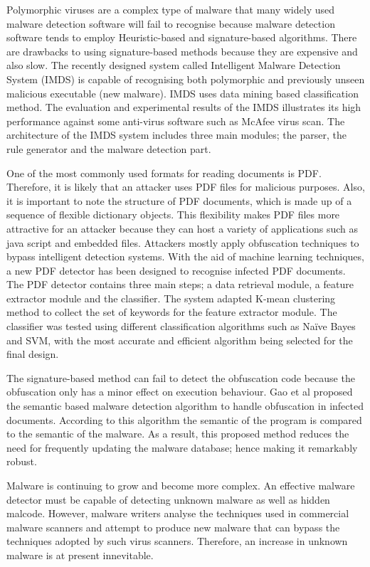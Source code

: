 Polymorphic viruses are a complex type of malware that many widely used malware detection software will fail to recognise because malware detection software tends to employ Heuristic-based and signature-based algorithms. There are drawbacks to using signature-based methods because they are expensive and also slow.  The recently designed system called Intelligent Malware Detection System (IMDS) is capable of recognising both polymorphic and previously unseen malicious executable (new malware). IMDS uses data mining based classification method. The evaluation and experimental results of the IMDS illustrates its high performance against some anti-virus software such as McAfee virus scan. The architecture of the IMDS system includes three main modules; the parser, the rule generator and the malware detection part\cite{IMDS}.

One of the most commonly used formats for reading documents is PDF. Therefore, it is likely that an attacker uses PDF files for malicious purposes. Also, it is important to note the structure of PDF documents, which is made up of a sequence of flexible dictionary objects. This flexibility makes PDF files more attractive for an attacker because they can host a variety of applications such as java script and embedded files. Attackers mostly apply obfuscation techniques to bypass intelligent detection systems. With the aid of machine learning techniques, a new PDF detector has been designed to recognise infected PDF documents\cite{maiorca2012pattern}.
The PDF detector contains three main steps; a data retrieval module, a feature extractor module and the classifier. The system adapted K-mean clustering method to collect the set of keywords for the feature extractor module. The classifier was tested using different classification algorithms such as Naïve Bayes and SVM, with the most accurate and efficient algorithm being selected for the final design\cite{maiorca2012pattern}.
 
The signature-based method can fail to detect the obfuscation code because the obfuscation only has a minor effect on execution behaviour. Gao et al proposed the semantic based malware detection algorithm to handle obfuscation in infected documents. According to this algorithm the semantic of the program is compared to the semantic of the malware. As a result, this proposed method reduces the need for frequently updating the malware database; hence making it remarkably robust\cite{Amom}. 


Malware is continuing to grow and become more complex. An effective malware detector must be capable of detecting unknown malware as well as hidden malcode. However, malware writers analyse the techniques used in commercial malware scanners and attempt to produce new malware that can bypass the techniques adopted by such virus scanners. Therefore, an increase in unknown malware is at present innevitable\cite{vinod2009survey}.


